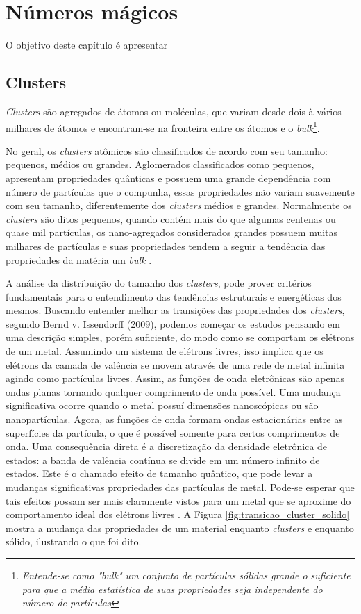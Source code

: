 \chapter{Números mágicos}
\label{c2}

O objetivo deste capítulo é apresentar

\section{Clusters}
\label{c2-clusters}

\textit{Clusters} são agregados de átomos ou moléculas, que variam desde dois à vários milhares de átomos e encontram-se na fronteira entre os átomos e o \textit{bulk}\footnote{\textit{Entende-se como "bulk" um conjunto de partículas sólidas grande o suficiente para que a média estatística de suas propriedades seja independente do número de partículas\cite{bulk}}}\cite{Heer,Brack}. 

No geral, os \textit{clusters} atômicos são classificados de acordo com seu tamanho: pequenos, médios ou grandes. Aglomerados classificados como pequenos, apresentam propriedades quânticas e possuem uma grande dependência com número de partículas que o compunha, essas propriedades não variam suavemente com seu tamanho, diferentemente dos \textit{clusters} médios e grandes. Normalmente os \textit{clusters} são ditos pequenos, quando contém mais do que algumas centenas ou quase mil partículas, os nano-agregados considerados grandes possuem muitas milhares de partículas e suas propriedades tendem a seguir a tendência das propriedades da matéria um \textit{bulk} \cite{livro_cluster}.

A análise da distribuição do tamanho dos \textit{clusters}, pode prover critérios fundamentais para o entendimento das tendências estruturais e energéticas dos mesmos. Buscando entender melhor as transições das propriedades dos \textit{clusters}, segundo Bernd v. Issendorff (2009), podemos começar os estudos pensando em uma descrição simples, porém suficiente, do modo como se comportam os elétrons de um metal. Assumindo um sistema de elétrons livres, isso implica que os elétrons da camada de valência se movem através de uma rede de metal infinita agindo como partículas livres. Assim, as funções de onda eletrônicas são apenas ondas planas tornando qualquer comprimento de onda possível. Uma mudança significativa ocorre quando o metal possuí dimensões nanoscópicas ou são nanopartículas. Agora, as funções de onda formam ondas estacionárias entre as superfícies da partícula, o que é possível somente para certos comprimentos de onda. Uma consequência direta é a discretização da densidade eletrônica de estados: a banda de valência contínua se divide em um número infinito de estados. Este é o chamado efeito de tamanho quântico, que pode levar a mudanças significativas propriedades das partículas de metal. Pode-se esperar que tais efeitos possam ser mais claramente vistos para um metal que se aproxime do comportamento ideal dos elétrons livres \cite{capitulo_livro_shell}. A Figura \ref{fig:transicao_cluster_solido} mostra a mudança das propriedades de um material enquanto \textit{clusters} e enquanto sólido, ilustrando o que foi dito.


